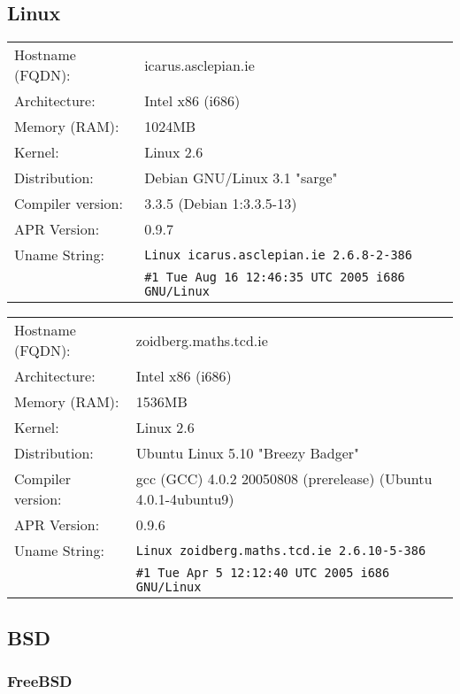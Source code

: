 
\subsection{Linux}

\begin{tabular}{ll}
Hostname (FQDN):	&	icarus.asclepian.ie 				\\
Architecture:		&	Intel x86 (i686)					\\
Memory (RAM):		&	1024MB								\\
Kernel:				&	Linux 2.6							\\
Distribution:		&	Debian GNU/Linux 3.1 "sarge"	\\
Compiler version:	&	3.3.5 (Debian 1:3.3.5-13)		\\
APR Version:		&	0.9.7									\\
Uname String:		& \verb!Linux icarus.asclepian.ie 2.6.8-2-386! 		\\
						& \verb!#1 Tue Aug 16 12:46:35 UTC 2005 i686 GNU/Linux!	\\
\end{tabular}

\begin{tabular}{ll}
Hostname (FQDN):	&	zoidberg.maths.tcd.ie					\\
Architecture:		&	Intel x86 (i686)							\\
Memory (RAM):		&	1536MB										\\
Kernel:				&	Linux 2.6									\\
Distribution:		&	Ubuntu Linux 5.10 "Breezy Badger"	\\
Compiler version:	&	gcc (GCC) 4.0.2 20050808 (prerelease) (Ubuntu 4.0.1-4ubuntu9)\\
APR Version:		&	0.9.6									\\
Uname String:		& \verb!Linux zoidberg.maths.tcd.ie 2.6.10-5-386!\\
						& \verb!#1 Tue Apr 5 12:12:40 UTC 2005 i686 GNU/Linux!\\

\end{tabular}

\subsection{BSD}

\subsubsection{FreeBSD}

